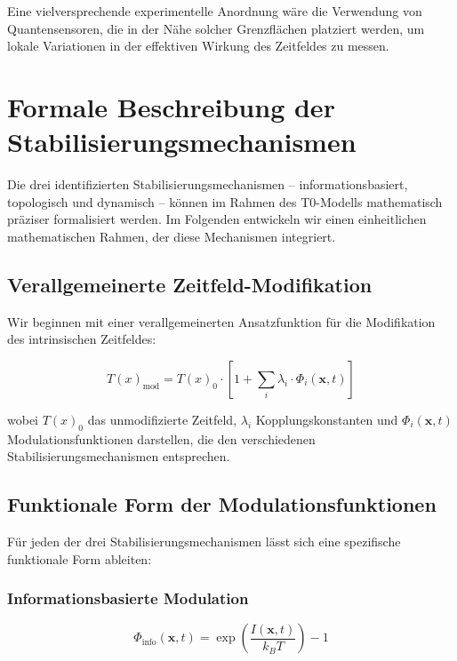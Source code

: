 \documentclass[12pt,a4paper]{article}
\newcommand{\Tfield}{T(x)}
\begin{document}
	Eine vielversprechende experimentelle Anordnung wäre die Verwendung von Quantensensoren, die in der Nähe solcher Grenzflächen platziert werden, um lokale Variationen in der effektiven Wirkung des Zeitfeldes zu messen.
	
	\section{Formale Beschreibung der Stabilisierungsmechanismen}
	
	Die drei identifizierten Stabilisierungsmechanismen – informationsbasiert, topologisch und dynamisch – können im Rahmen des T0-Modells mathematisch präziser formalisiert werden. Im Folgenden entwickeln wir einen einheitlichen mathematischen Rahmen, der diese Mechanismen integriert.
	
	\subsection{Verallgemeinerte Zeitfeld-Modifikation}
	
	Wir beginnen mit einer verallgemeinerten Ansatzfunktion für die Modifikation des intrinsischen Zeitfeldes:
	
	\begin{equation}
		\Tfield_{\text{mod}} = \Tfield_0 \cdot \left[ 1 + \sum_i \lambda_i \cdot \Phi_i(\mathbf{x}, t) \right]
	\end{equation}
	
	wobei $\Tfield_0$ das unmodifizierte Zeitfeld, $\lambda_i$ Kopplungskonstanten und $\Phi_i(\mathbf{x}, t)$ Modulationsfunktionen darstellen, die den verschiedenen Stabilisierungsmechanismen entsprechen.
	
	\subsection{Funktionale Form der Modulationsfunktionen}
	
	Für jeden der drei Stabilisierungsmechanismen lässt sich eine spezifische funktionale Form ableiten:
	
	\subsubsection{Informationsbasierte Modulation}
	
	\begin{equation}
		\Phi_{\text{info}}(\mathbf{x}, t) = \exp\left(\frac{I(\mathbf{x}, t)}{k_B T}\right) - 1
	\end{equation}
	
\end{document}
